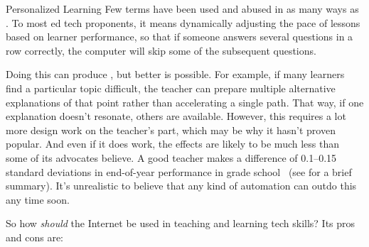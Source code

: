 \begin{aside}{Personalized Learning}
  Few terms have been used and abused in as many ways
  as .
  To most ed tech proponents,
  it means dynamically adjusting the pace of lessons based on learner performance,
  so that if someone answers several questions in a row correctly,
  the computer will skip some of the subsequent questions.

  Doing this can produce
  ,
  but better is possible.
  For example,
  if many learners find a particular topic difficult,
  the teacher can prepare multiple alternative explanations of that point
  rather than accelerating a single path.
  That way,
  if one explanation doesn't resonate,
  others are available.
  However,
  this requires a lot more design work on the teacher's part,
  which may be why it hasn't proven popular.
  And even if it does work,
  the effects are likely to be much less than some of its advocates believe.
  A good teacher makes a difference of 0.1--0.15 standard deviations in end-of-year performance in grade school~\cite{Chet2014}
  (see  for a brief summary).
  It's unrealistic to believe that any kind of automation can outdo this any time soon.
\end{aside}

So how \emph{should} the Internet be used in teaching and learning tech skills?
Its pros and cons are:

